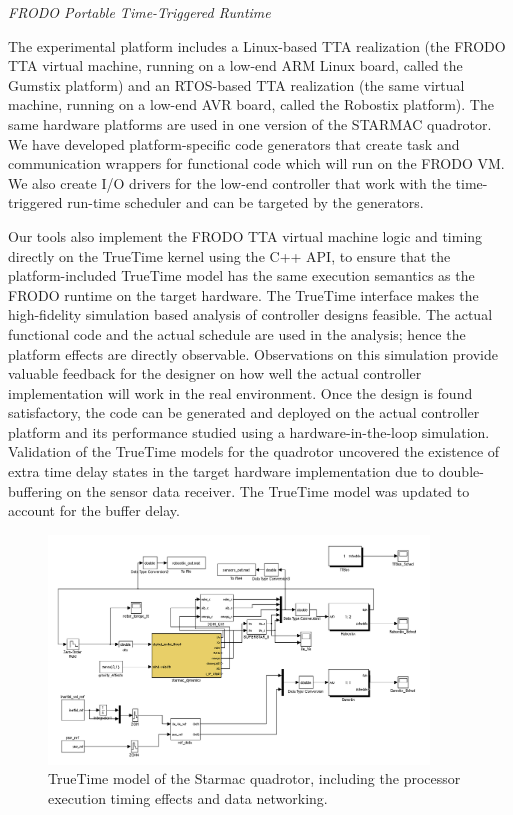 \emph{FRODO Portable Time-Triggered Runtime}

The experimental platform includes a Linux-based TTA realization (the FRODO TTA virtual
machine, running on a low-end ARM Linux board, called the Gumstix platform) and an RTOS-based
TTA realization (the same virtual machine, running on a low-end AVR board, called
the Robostix platform). The same hardware platforms are used in one version of the STARMAC quadrotor.
We have developed platform-specific code generators that create task and communication wrappers for functional
code which will run on the FRODO VM.  We also create I/O drivers for the low-end controller that work with the
time-triggered run-time scheduler and can be targeted by the generators. 

Our tools also implement the FRODO TTA virtual machine logic and timing directly on the TrueTime kernel using the C++ API, to ensure that the platform-included TrueTime model has the same execution semantics as the FRODO runtime on the target hardware\cite{gh_truetime}. 
The TrueTime interface makes the high-fidelity simulation based analysis of controller designs feasible. The actual functional code and the actual schedule are used in the analysis; hence the platform effects are directly observable.  Observations on this simulation provide valuable feedback for the designer on how well the actual controller implementation will work in the real environment. Once the design is found satisfactory, the code can be generated and deployed on the actual controller platform and its performance studied using a hardware-in-the-loop simulation.
Validation of the TrueTime models for the quadrotor uncovered the existence of extra time delay states in the target hardware implementation due to double-buffering on the sensor data receiver.  The TrueTime model was updated to account for the buffer delay.


\begin{figure}[thpb]
\centering
\includegraphics[width=0.9\textwidth]{img/qr_tt}
\caption{TrueTime model of the Starmac quadrotor, including the processor execution timing effects and data networking.}
\label{fig:qr_tt}
\end{figure}



